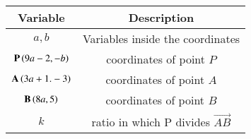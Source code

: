 \begin{tabular}[12pt]{ |c| c|}
    \hline
        \textbf{Variable}  & \textbf{Description}\\
    \hline
        $a,b$ &  Variables inside the coordinates\\
    \hline 
        $\mathbf{P}\left(9a-2,-b\right)$ & coordinates of point $P$\\
    \hline
	$\mathbf{A}\left(3a+1.-3\right)$ & coordinates of point $A$\\
    \hline
	$\mathbf{B}\left(8a,5\right)$ & coordinates of point $B$\\
    \hline
	$k$ & ratio in which P divides $\vec{AB}$\\
    \hline 
\end{tabular}
